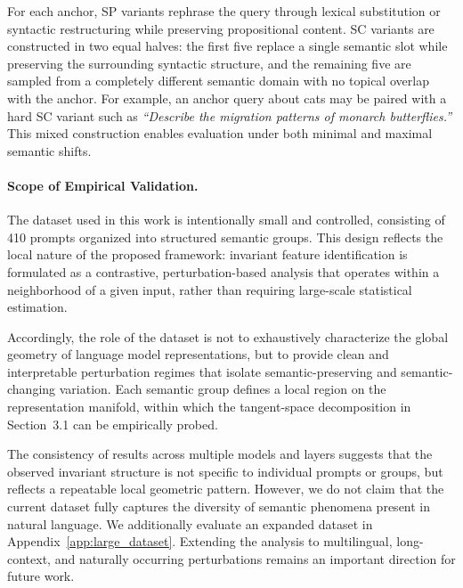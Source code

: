 For each anchor, SP variants rephrase the query through lexical substitution or syntactic restructuring while preserving propositional content. SC variants are constructed in two equal halves: the first five replace a single semantic slot while preserving the surrounding syntactic structure, and the remaining five are sampled from a completely different semantic domain with no topical overlap with the anchor. For example, an anchor query about cats may be paired with a hard SC variant such as \textit{``Describe the migration patterns of monarch butterflies.''} This mixed construction enables evaluation under both minimal and maximal semantic shifts.

\paragraph{Scope of Empirical Validation.}
The dataset used in this work is intentionally small and controlled, consisting of 410 prompts organized into structured semantic groups. This design reflects the local nature of the proposed framework: invariant feature identification is formulated as a contrastive, perturbation-based analysis that operates within a neighborhood of a given input, rather than requiring large-scale statistical estimation.

Accordingly, the role of the dataset is not to exhaustively characterize the global geometry of language model representations, but to provide clean and interpretable perturbation regimes that isolate semantic-preserving and semantic-changing variation. Each semantic group defines a local region on the representation manifold, within which the tangent-space decomposition in Section~3.1 can be empirically probed.

The consistency of results across multiple models and layers suggests that the observed invariant structure is not specific to individual prompts or groups, but reflects a repeatable local geometric pattern. However, we do not claim that the current dataset fully captures the diversity of semantic phenomena present in natural language.
We additionally evaluate an expanded dataset in Appendix~\ref{app:large_dataset}. Extending the analysis to multilingual, long-context, and naturally occurring perturbations remains an important direction for future work.